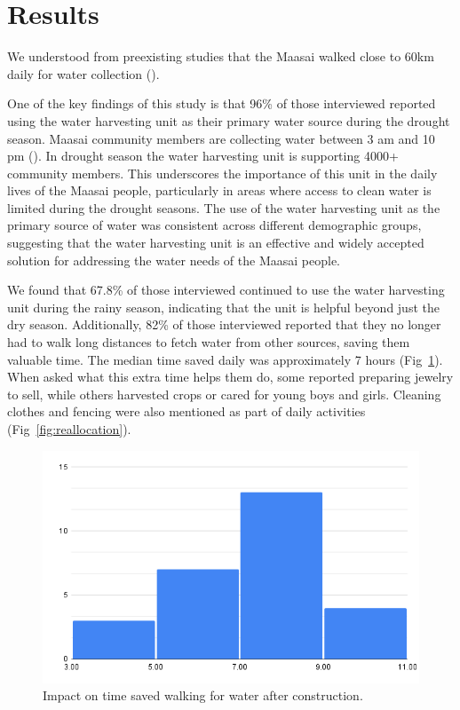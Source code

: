 \documentclass[10pt, twocolumn]{article}
\begin{document}
\section{Results}

We understood from preexisting studies that the Maasai walked close to 60km daily for water collection (\autocite{choi2014salient}). 

One of the key findings of this study is that 96\% of those interviewed reported using the water harvesting unit as their primary water source during the drought season. Maasai community members are collecting water between 3 am and 10 pm (\autocite{Google}). In drought season the water harvesting unit is supporting 4000+ community members. This underscores the importance of this unit in the daily lives of the Maasai people, particularly in areas where access to clean water is limited during the drought seasons. The use of the water harvesting unit as the primary source of water was consistent across different demographic groups, suggesting that the water harvesting unit is an effective and widely accepted solution for addressing the water needs of the Maasai people.

We found that 67.8\% of those  interviewed continued to use the water harvesting unit during the rainy season, indicating that the unit is helpful beyond just the dry season. Additionally, 82\% of those interviewed reported that they no longer had to walk long distances to fetch water from other sources, saving them valuable time. The median time saved daily was approximately 7 hours (Fig~\ref{fig:time_saved}). When asked what this extra time helps them do, some reported preparing jewelry to sell, while others harvested crops or cared for young boys and girls. Cleaning clothes and fencing  were also mentioned as part of daily activities (Fig~\ref{fig:reallocation}).

\begin{figure}
    \centering
    \includegraphics[width=1\linewidth]{photos/time_saved.png}
    \caption{Impact on time saved walking for water after construction.}
    \label{fig:time_saved}
\end{figure}
\end{document}
